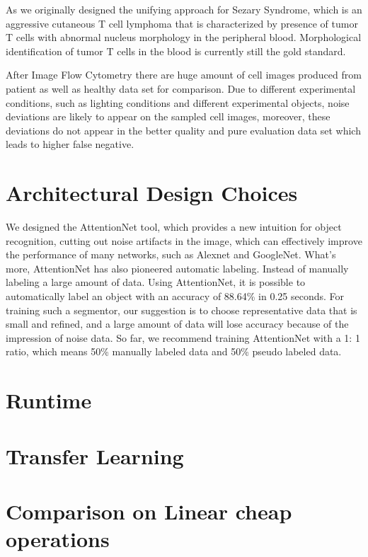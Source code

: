 As we originally designed the unifying approach for Sezary Syndrome, which is an aggressive cutaneous T cell lymphoma that is characterized by presence of tumor T cells with abnormal nucleus morphology in the peripheral blood. Morphological identification of tumor T cells in the blood is currently still the gold standard.

After Image Flow Cytometry there are huge amount of cell images produced from patient as well as healthy data set for comparison. Due to different experimental conditions, such as lighting conditions and different experimental objects, noise deviations are likely to appear on the sampled cell images, moreover, these deviations do not appear in the better quality and pure evaluation data set which leads to higher false negative.


\section{Architectural Design Choices}
\label{sec:lorem}

We designed the AttentionNet tool, which provides a new intuition for object recognition, cutting out noise artifacts in the image, which can effectively improve the performance of many networks, such as Alexnet and GoogleNet. What’s more, AttentionNet has also pioneered automatic labeling. Instead of manually labeling a large amount of data. Using AttentionNet, it is possible to automatically label an object with an accuracy of 88.64\% in 0.25 seconds. For training such a segmentor, our suggestion is to choose representative data that is small and refined, and a large amount of data will lose accuracy because of the impression of noise data. So far, we recommend training AttentionNet with a 1: 1 ratio, which means 50\% manually labeled data and 50\% pseudo labeled data.

\section{Runtime}
\label{sec:ipsum}





\section{Transfer Learning} %
\label{sub:amet}


\section{Comparison on Linear cheap operations} %
\label{sub:amet}




